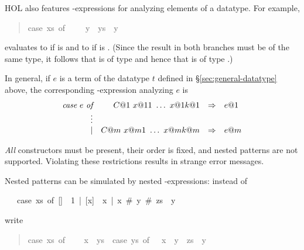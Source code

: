 %
\begin{isabellebody}%
%
%
\begin{isamarkuptext}%
\label{sec:case-expressions}
HOL also features -expressions for analyzing
elements of a datatype. For example,
\begin{quote}

\begin{isabelle}%
case\ \mbox{xs}\ of\ {\isacharbrackleft}{\isacharbrackright}\ {\isasymRightarrow}\ \ {\isacharbar}\ \mbox{y}\ {\isacharhash}\ \mbox{ys}\ {\isasymRightarrow}\ \mbox{y}
\end{isabelle}%

\end{quote}
evaluates to  if  is \isa{{\isacharbrackleft}{\isacharbrackright}} and to  if 
 is . (Since the result in both branches must be of
the same type, it follows that  is of type  and hence
that  is of type .)

In general, if $e$ is a term of the datatype $t$ defined in
\S\ref{sec:general-datatype} above, the corresponding
-expression analyzing $e$ is
\[
\begin{array}{rrcl}
\emph{\it case}~e~\emph{\it of} & C@1~x@ {11}~\dots~x@ {1k@1} & \Rightarrow & e@1 \\
                           \vdots \\
                           \mid & C@m~x@ {m1}~\dots~x@ {mk@m} & \Rightarrow & e@m
\end{array}
\]

\begin{warn}
\emph{All} constructors must be present, their order is fixed, and nested
patterns are not supported.  Violating these restrictions results in strange
error messages.
\end{warn}
\noindent
Nested patterns can be simulated by nested -expressions: instead
of
\begin{isabelle}
~~~case~xs~of~[]~{\isasymRightarrow}~1~|~[x]~{\isasymRightarrow}~x~|~x~\#~y~\#~zs~{\isasymRightarrow}~y
\end{isabelle}
write
\begin{quote}

\begin{isabelle}%
case\ \mbox{xs}\ of\ {\isacharbrackleft}{\isacharbrackright}\ {\isasymRightarrow}\ \isanewline
{\isacharbar}\ \mbox{x}\ {\isacharhash}\ \mbox{ys}\ {\isasymRightarrow}\ case\ \mbox{ys}\ of\ {\isacharbrackleft}{\isacharbrackright}\ {\isasymRightarrow}\ \mbox{x}\ {\isacharbar}\ \mbox{y}\ {\isacharhash}\ \mbox{zs}\ {\isasymRightarrow}\ \mbox{y}
\end{isabelle}%


\end{quote}
\end{isamarkuptext}
\end{isabellebody}
